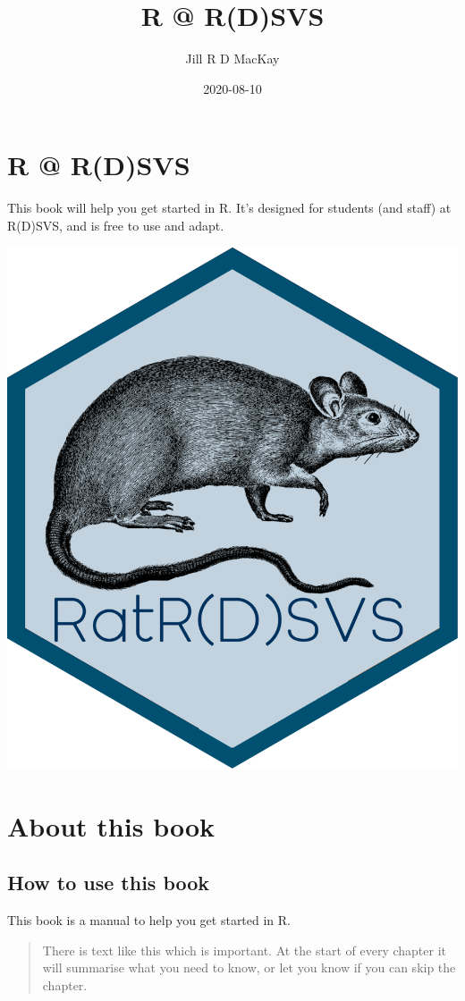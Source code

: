 \documentclass[
]{book}
\title{R @ R(D)SVS}
\author{Jill R D MacKay}
\date{2020-08-10}
\begin{document}
\maketitle

{
\setcounter{tocdepth}{1}
\tableofcontents
}
\hypertarget{r-rdsvs}{%
\chapter*{R @ R(D)SVS}\label{r-rdsvs}}

This book will help you get started in R. It's designed for students (and staff) at R(D)SVS, and is free to use and adapt.

\begin{center}\includegraphics[width=0.5\linewidth]{images/ratrdsvs} \end{center}

\hypertarget{about}{%
\chapter*{About this book}\label{about}}

\hypertarget{howuse}{%
\section{How to use this book}\label{howuse}}

This book is a manual to help you get started in R.

\begin{quote}
There is text like this which is important. At the start of every chapter it will summarise what you need to know, or let you know if you can skip the chapter.
\end{quote}
\end{document}
